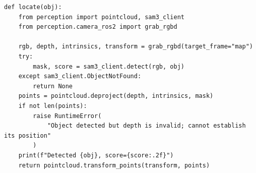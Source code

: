 \documentclass[11pt,a4paper]{book}
\begin{document}
\begin{lstlisting}[firstnumber=60]
def locate(obj):
    from perception import pointcloud, sam3_client
    from perception.camera_ros2 import grab_rgbd

    rgb, depth, intrinsics, transform = grab_rgbd(target_frame="map")
    try:
        mask, score = sam3_client.detect(rgb, obj)
    except sam3_client.ObjectNotFound:
        return None
    points = pointcloud.deproject(depth, intrinsics, mask)
    if not len(points):
        raise RuntimeError(
            "Object detected but depth is invalid; cannot establish its position"
        )
    print(f"Detected {obj}, score={score:.2f}")
    return pointcloud.transform_points(transform, points)


\end{lstlisting}
\end{document}
